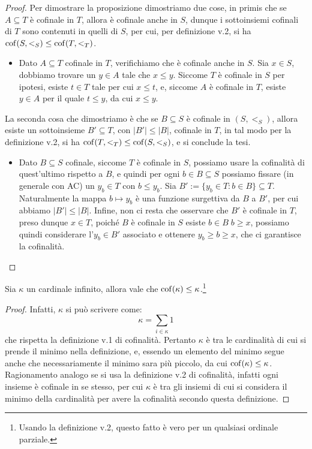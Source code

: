 \begin{proof}
	Per dimostrare la proposizione dimostriamo due cose, in primis che se $A \subseteq T$ è cofinale in $T$, allora è cofinale anche in $S$, dunque i sottoinsiemi cofinali di $T$ sono contenuti in quelli di $S$, per cui, per definizione v.2, si ha $\operatorname{cof}(S,<_S) \leq \operatorname{cof}(T,<_T)$.
	\begin{itemize}
		\item Dato $A \subseteq T$ cofinale in $T$, verifichiamo che è cofinale anche in $S$. Sia $x \in S$, dobbiamo trovare un $y \in A$ tale che $x \leq y$. Siccome $T$ è cofinale in $S$ per ipotesi, esiste $t \in T$ tale per cui $x \leq t$, e, siccome 
		$A$ è cofinale in $T$, esiste $y \in A$ per il quale $t \leq y$, da cui $x \leq y$.
	\end{itemize}
	La seconda cosa che dimostriamo è che se $B \subseteq S$ è cofinale in $(S,<_S)$, allora esiste un sottoinsieme $B' \subseteq T$, con $|B'| \leq |B|$, cofinale in $T$, in tal modo per la definizione v.2, si ha $\operatorname{cof}(T,<_T) \leq \operatorname{cof}(S,<_S)$, e si conclude la tesi.
	\begin{itemize}
		\item Dato $B \subseteq S$ cofinale, siccome $T$ è cofinale in $S$, possiamo usare la cofinalità di quest'ultimo rispetto a $B$, e quindi per ogni $b \in B \subseteq S$ possiamo fissare (in generale con AC) un $y_b \in T$ con $b \leq y_b$. Sia $B' := \{y_b \in T : b \in B\} \subseteq T$.\\
		Naturalmente la mappa $b \mapsto y_b$ è una funzione surgettiva da $B$ a $B'$, per cui abbiamo $|B'| \leq |B|$. Infine, non ci resta che osservare che $B'$ è cofinale in $T$, preso dunque $x \in T$, poiché $B$ è cofinale in $S$ esiste $b \in B \; b \geq x$,
		possiamo quindi considerare l'$y_b \in B'$ associato e ottenere $y_b \geq b \geq x$, che ci garantisce la cofinalità.
	\end{itemize}
\end{proof}

\begin{proposition}
	Sia $\kappa$ un cardinale infinito, allora vale che $\operatorname{cof}(\kappa) \leq \kappa$.\footnote{Usando la definizione v.2, questo fatto è vero per un qualsiasi ordinale parziale.}
\end{proposition}

\begin{proof}
	Infatti, $\kappa$ si può scrivere come:
	\[ \kappa = \sum_{i \in \kappa} 1
		\]
	che rispetta la definizione v.1 di cofinalità. Pertanto $\kappa$ è tra le cardinalità di cui si prende il minimo nella definizione, e, essendo un elemento
	del minimo segue anche che necessariamente il minimo sara più piccolo, da cui $\operatorname{cof}(\kappa) \leq \kappa$.\\
	Ragionamento analogo se si usa la definizione v.2 di cofinalità, infatti ogni insieme è cofinale in se stesso, per cui $\kappa$ è tra gli insiemi di cui si considera il minimo della cardinalità per avere la cofinalità secondo questa definizione.
\end{proof}

